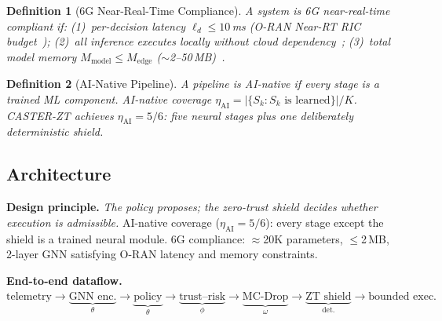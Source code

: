 \documentclass[lettersize,journal]{IEEEtran}
\newtheorem{definition}{Definition}
\begin{document}
\begin{definition}[6G Near-Real-Time Compliance]
\label{def:6g_compliance}
A system is \emph{6G near-real-time compliant} if:
(1)~per-decision latency $\ell_d \le 10$\,ms (O-RAN Near-RT RIC budget~\cite{oran_official_architecture,oran_ngrg_2024});
(2)~all inference executes locally without cloud dependency~\cite{raftopoulos2024drl};
(3)~total model memory $M_{\mathrm{model}} \le M_{\mathrm{edge}}$ ($\sim$2--50\,MB)~\cite{oran_official_architecture,dasilva2024xapp}.
\end{definition}

\begin{definition}[AI-Native Pipeline]
\label{def:ai_native}
A pipeline is \emph{AI-native} if every stage is a trained ML component.
AI-native coverage $\eta_{\mathrm{AI}} = |\{S_k : S_k\text{ is learned}\}|/K$.
CASTER-ZT achieves $\eta_{\mathrm{AI}} = 5/6$: five neural stages plus one deliberately deterministic shield.
\end{definition}


\subsection{Architecture}
\label{sec:architecture}

\noindent\textbf{Design principle.}
\emph{The policy proposes; the zero-trust shield decides whether execution is admissible.}
AI-native coverage ($\eta_{\mathrm{AI}} = 5/6$): every stage except the shield is a trained neural module.
6G compliance: $\approx$20K parameters, $\le$2\,MB, 2-layer GNN satisfying O-RAN latency and memory constraints.

\noindent\textbf{End-to-end dataflow.}
{\small
$\text{telemetry} \to \underbrace{\text{GNN enc.}}_{\theta} \to \underbrace{\text{policy}}_{\theta} \to \underbrace{\text{trust--risk}}_{\phi} \to \underbrace{\text{MC-Drop}}_{\omega} \to \underbrace{\text{ZT shield}}_{\text{det.}} \to \text{bounded exec.}$
}
\end{document}
